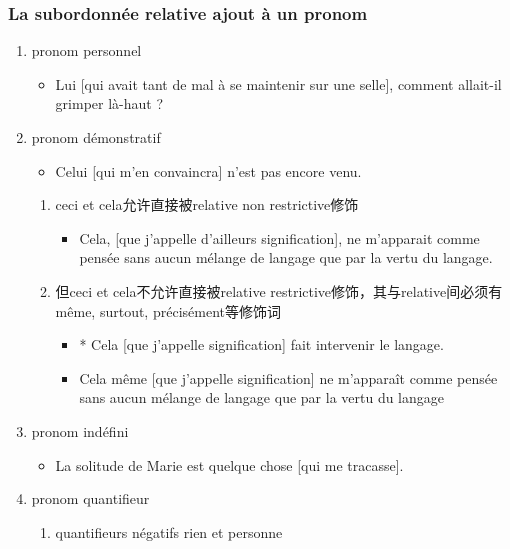 \documentclass[UTF8]{report}
\begin{document}
\subsubsection{La subordonnée relative ajout à un pronom}
\begin{enumerate}
    \item pronom personnel
    \begin{itemize}
        \item Lui [qui avait tant de mal à se maintenir sur une selle], comment allait-il grimper là-haut ?
    \end{itemize}
    \item pronom démonstratif
    \begin{itemize}
        \item Celui [qui m’en convaincra] n’est pas encore venu.
    \end{itemize}
    \begin{enumerate}
        \item ceci et cela允许直接被relative non restrictive修饰
        \begin{itemize}
            \item Cela, [que j’appelle d’ailleurs signification], ne m’apparait comme pensée sans aucun mélange de langage que par la vertu du langage.
        \end{itemize}
        \item 但ceci et cela不允许直接被relative restrictive修饰，其与relative间必须有même, surtout, précisément等修饰词
        \begin{itemize}
            \item * Cela [que j’appelle signification] fait intervenir le langage.
            \item Cela même [que j’appelle signification] ne m’apparaît comme pensée sans aucun mélange de langage que par la vertu du langage
        \end{itemize}
    \end{enumerate}
    \item pronom indéfini
    \begin{itemize}
        \item La solitude de Marie est quelque chose [qui me tracasse].
    \end{itemize}
    \item pronom quantifieur
    \begin{enumerate}
        \item quantifieurs négatifs rien et personne
        \begin{itemize}

\end{itemize}
\end{enumerate}
\end{enumerate}
\end{document}
